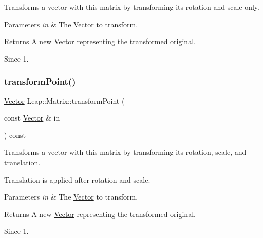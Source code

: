Transforms a vector with this matrix by transforming its rotation and scale only.


\begin{DoxyCodeInclude}
\end{DoxyCodeInclude}



\begin{DoxyParams}{Parameters}
{\em in} & The \hyperlink{struct_leap_1_1_vector}{Vector} to transform. \\
\hline
\end{DoxyParams}
\begin{DoxyReturn}{Returns}
A new \hyperlink{struct_leap_1_1_vector}{Vector} representing the transformed original. 
\end{DoxyReturn}
\begin{DoxySince}{Since}
1. 
\end{DoxySince}
\mbox{\label{struct_leap_1_1_matrix_ac583a10a7bdbf7ed03fd53b8604a41fc}} 
\subsubsection{\texorpdfstring{transform\+Point()}{transformPoint()}}
{\footnotesize\ttfamily \hyperlink{struct_leap_1_1_vector}{Vector} Leap\+::\+Matrix\+::transform\+Point (\begin{DoxyParamCaption}\item[{const \hyperlink{struct_leap_1_1_vector}{Vector} \&}]{in }\end{DoxyParamCaption}) const\hspace{0.3cm}{\ttfamily [inline]}}

Transforms a vector with this matrix by transforming its rotation, scale, and translation.


\begin{DoxyCodeInclude}
\end{DoxyCodeInclude}


Translation is applied after rotation and scale.


\begin{DoxyParams}{Parameters}
{\em in} & The \hyperlink{struct_leap_1_1_vector}{Vector} to transform. \\
\hline
\end{DoxyParams}
\begin{DoxyReturn}{Returns}
A new \hyperlink{struct_leap_1_1_vector}{Vector} representing the transformed original. 
\end{DoxyReturn}
\begin{DoxySince}{Since}
1. 
\end{DoxySince}


